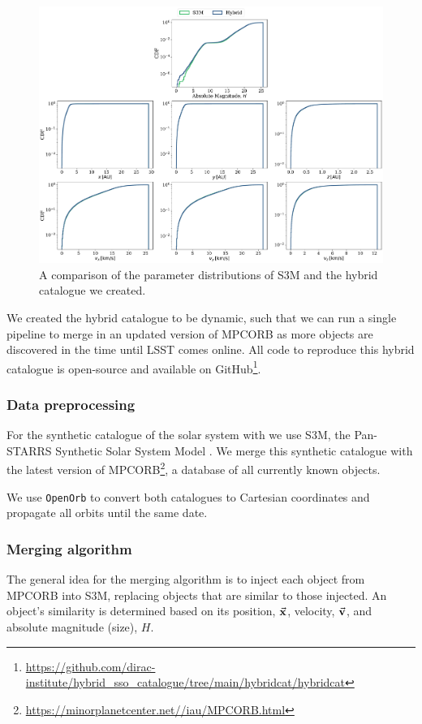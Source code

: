 \documentclass[twocolumn, twocolappendix]{aastex631}
\newcommand{\sss}{S3M}
\newcommand{\mpco}{MPCORB}
\begin{document}
\begin{figure}[htb]
    \centering
    \includegraphics[width=\textwidth]{hybrid_vs_s3m_distributions.pdf}
    \caption{A comparison of the parameter distributions of S3M \citep{Granvik+2009} and the hybrid catalogue we created.}
    \label{fig:hybrid_vs_s3m_dists}
\end{figure}

We created the hybrid catalogue to be dynamic, such that we can run a single pipeline to merge in an updated version of \mpco{} as more objects are discovered in the time until LSST comes online. All code to reproduce this hybrid catalogue is open-source and available on GitHub\footnote{\url{https://github.com/dirac-institute/hybrid_sso_catalogue/tree/main/hybridcat/hybridcat}}.

\subsubsection{Data preprocessing}
For the synthetic catalogue of the solar system with we use \sss{}, the Pan-STARRS Synthetic Solar System Model \citep{Grav+2011}. We merge this synthetic catalogue with the latest version of \mpco{}\footnote{\url{https://minorplanetcenter.net//iau/MPCORB.html}}, a database of all currently known objects.

We use \texttt{OpenOrb} \citep{Granvik+2009} to convert both catalogues to Cartesian coordinates and propagate all orbits until the same date.

\subsubsection{Merging algorithm}
The general idea for the merging algorithm is to inject each object from \mpco{} into \sss{}, replacing objects that are similar to those injected. An object's similarity is determined based on its position, $\va{x}$, velocity, $\va{v}$, and absolute magnitude (size), ${H}$.
\end{document}
